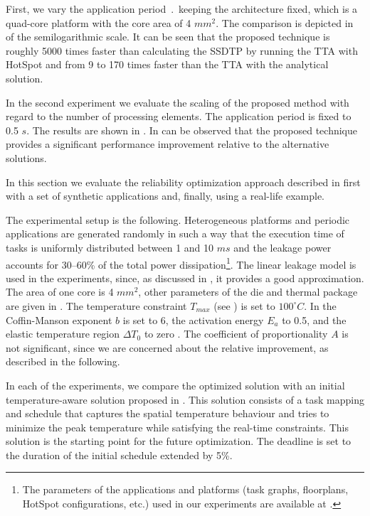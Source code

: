 First, we vary the application period $\period$ keeping the architecture fixed, which is a quad-core platform with the core area of 4 $mm^2$. The comparison is depicted in  of the semilogarithmic scale. It can be seen that the proposed technique is roughly 5000 times faster than calculating the SSDTP by running the TTA with HotSpot and from 9 to 170 times faster than the TTA with the analytical solution.

In the second experiment we evaluate the scaling of the proposed method with regard to the number of processing elements. The application period is fixed to 0.5 $s$. The results are shown in . In can be observed that the proposed technique provides a significant performance improvement relative to the alternative solutions.

 \label{sec:reliability-results}
In this section we evaluate the reliability optimization approach described in  first with a set of synthetic applications and, finally, using a real-life example.

The experimental setup is the following. Heterogeneous platforms and periodic applications are generated randomly \cite{dick1998} in such a way that the execution time of tasks is uniformly distributed between 1 and 10 $ms$ and the leakage power accounts for 30--60\% of the total power dissipation\footnote{The parameters of the applications and platforms (task graphs, floorplans, HotSpot configurations, etc.) used in our experiments are available at \cite{liu2011}.}. The linear leakage model is used in the experiments, since, as discussed in , it provides a good approximation. The area of one core is 4 $mm^2$, other parameters of the die and thermal package are given in . The temperature constraint $T_{max}$ (see ) is set to $100^\circ C$. In  the Coffin-Manson exponent $b$ is set to 6, the activation energy $E_a$ to 0.5, and the elastic temperature region $\Delta T_0$ to zero \cite{jedec2010}. The coefficient of proportionality $A$ is not significant, since we are concerned about the relative improvement, as described in the following.

In each of the experiments, we compare the optimized solution with an initial temperature-aware solution proposed in \cite{xie2006}. This solution consists of a task mapping and schedule that captures the spatial temperature behaviour and tries to minimize the peak temperature while satisfying the real-time constraints. This solution is the starting point for the future optimization. The deadline is set to the duration of the initial schedule extended by 5\%.

